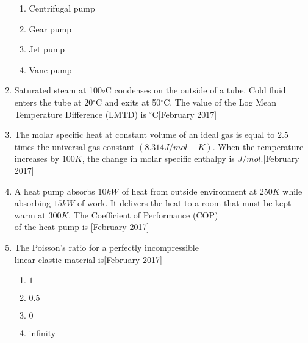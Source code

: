 \documentclass[journal]{IEEEtran}
\begin{document}
\begin{enumerate}
\begin{enumerate}
    \item Centrifugal pump
    \item Gear pump
    \item Jet pump
    \item Vane pump
\end{enumerate}
\item Saturated steam at 100$\circ$C condenses on the outside of a tube. Cold fluid enters the tube at 20$^\circ$C and exits at 50$^\circ$C. The value of the Log Mean Temperature Difference (LMTD) is\underline{\hspace{2cm}} $^\circ$C\hfill[February 2017]
\item The molar specific heat at constant volume of an ideal gas is equal to $2.5$ times the universal gas constant $(8.314 J/mol-K)$. When the temperature increases by $100 K$, the change in molar specific enthalpy is \underline{\hspace{2cm}} $J/mol$.\hfill[February 2017]
\item A heat pump absorbs $10 kW$ of heat from outside environment at $250 K$ while absorbing $15 kW$ of work. It delivers the heat to a room that must be kept warm at $300 K$. The Coefficient of Performance (COP) \\ of the heat pump is \underline{\hspace{2cm}}\hfill[February 2017]
\item The Poisson's ratio for a perfectly incompressible \\linear elastic material is\hfill[February 2017]
\begin{enumerate}
    \item $1$
    \item $0.5$
    \item $0$
    \item infinity
\end{enumerate}
\end{enumerate}
\end{document}
